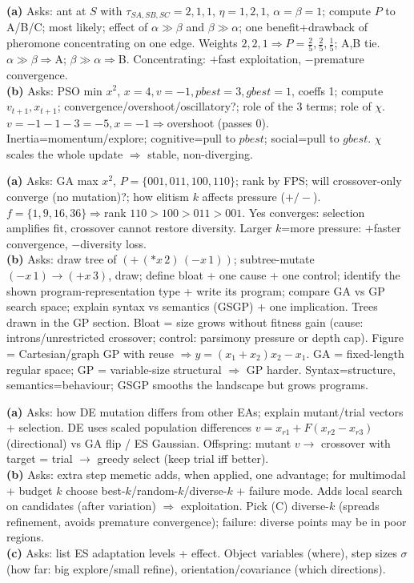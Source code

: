 \textbf{(a)} Asks: ant at \(S\) with \(\tau_{SA,SB,SC}{=}2,1,1\), \(\eta{=}1,2,1\), \(\alpha{=}\beta{=}1\); compute \(P\) to A/B/C; most likely; effect of \(\alpha\!\gg\!\beta\) and \(\beta\!\gg\!\alpha\); one benefit+drawback of pheromone concentrating on one edge. Weights \(2,2,1\Rightarrow P{=}\tfrac25,\tfrac25,\tfrac15\); A,B tie. \(\alpha\!\gg\!\beta\Rightarrow\)A; \(\beta\!\gg\!\alpha\Rightarrow\)B. Concentrating: \(+\)fast exploitation, \(-\)premature convergence.\\
\textbf{(b)} Asks: PSO min \(x^2\), \(x{=}4,v{=}-1,pbest{=}3,gbest{=}1\), coeffs 1; compute \(v_{t+1},x_{t+1}\); convergence/overshoot/oscillatory?; role of the 3 terms; role of \(\chi\). \(v{=}-1-1-3=-5,x{=}-1\Rightarrow\)overshoot (passes 0). Inertia=momentum/explore; cognitive=pull to \(pbest\); social=pull to \(gbest\). \(\chi\) scales the whole update \(\Rightarrow\) stable, non-diverging.

\textbf{(a)} Asks: GA max \(x^2\), \(P{=}\{001,011,100,110\}\); rank by FPS; will crossover-only converge (no mutation)?; how elitism \(k\) affects pressure (\(+/-\)). \(f{=}\{1,9,16,36\}\Rightarrow\)rank \(110{>}100{>}011{>}001\). Yes converges: selection amplifies fit, crossover cannot restore diversity. Larger \(k\)=more pressure: \(+\)faster convergence, \(-\)diversity loss.\\
\textbf{(b)} Asks: draw tree of \((+\,(\ast x\,2)\,(-x\,1))\); subtree-mutate \((-x\,1)\!\to\!(+x\,3)\), draw; define bloat + one cause + one control; identify the shown program-representation type + write its program; compare GA vs GP search space; explain syntax vs semantics (GSGP) + one implication. Trees drawn in the GP section. Bloat = size grows without fitness gain (cause: introns/unrestricted crossover; control: parsimony pressure or depth cap). Figure = Cartesian/graph GP with reuse \(\Rightarrow y=(x_1{+}x_2)x_2-x_1\). GA = fixed-length regular space; GP = variable-size structural \(\Rightarrow\) GP harder. Syntax=structure, semantics=behaviour; GSGP smooths the landscape but grows programs.

\textbf{(a)} Asks: how DE mutation differs from other EAs; explain mutant/trial vectors + selection. DE uses scaled population differences \(v=x_{r1}+F(x_{r2}-x_{r3})\) (directional) vs GA flip / ES Gaussian. Offspring: mutant \(v\to\) crossover with target = trial \(\to\) greedy select (keep trial iff better).\\
\textbf{(b)} Asks: extra step memetic adds, when applied, one advantage; for multimodal + budget \(k\) choose best-\(k\)/random-\(k\)/diverse-\(k\) + failure mode. Adds local search on candidates (after variation) \(\Rightarrow\) exploitation. Pick (C) diverse-\(k\) (spreads refinement, avoids premature convergence); failure: diverse points may be in poor regions.\\
\textbf{(c)} Asks: list ES adaptation levels + effect. Object variables (where), step sizes \(\sigma\) (how far: big explore/small refine), orientation/covariance (which directions).


